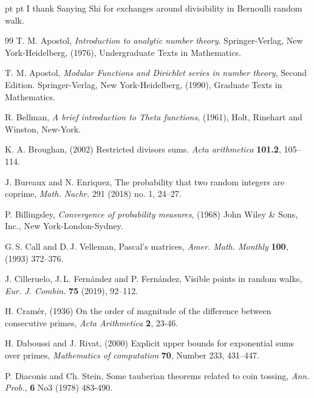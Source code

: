 \documentclass[11pt,draft,reqno]{amsart}
\theoremstyle{definition}
\theoremstyle{remarks}
\numberwithin{equation}{section}
\begin{document}
  pt
  pt  I    thank  Sanying Shi   for  exchanges     around divisibility  in Bernoulli random walk.  
 





 
\begin{thebibliography}{99}
  T. M. Apostol, \emph{Introduction to analytic number theory}. Springer-Verlag, New York-Heidelberg, (1976), Undergraduate Texts in Mathematics.
 
   T. M. Apostol, \emph{Modular Functions and Dirichlet series in number theory}, Second Edition. Springer-Verlag, New York-Heidelberg, (1990), Graduate Texts in Mathematics.
  
      R.  Bellman,  \emph{A brief introduction to Theta functions}, (1961), Holt, Rinehart and  Winston, New-York.

 K. A. Broughan, (2002) Restricted divisors sums. \emph{Acta arithmetica} {\bf 101.2},
105--114.
 
     J. Bureaux and N. Enriquez,   The probability that two random integers are coprime, \emph{Math. Nachr.} {291} (2018) no. 1, 24--27.  

   P. Billingsley,   \emph{  Convergence of probability measures}, (1968) John Wiley \& Sons, Inc.,
 New York-London-Sydney.  
 
   G.\,S. Call and D.\,J. Velleman, Pascal's matrices, \emph{Amer. Math. Monthly} {\bf 100},
  (1993) 372--376.
 
   J. Cilleruelo, J.\,L. Fern\'andez and P. Fern\'andez, Visible points in random walks, \emph{Eur. J. Combin. } {\bf 75} (2019),
  92--112. 
  
     H. Cram\'er, (1936) On the order of magnitude of the difference between consecutive primes, \emph{Acta
Arithmetica} {\bf 2},
  23-46.  

 H. Daboussi and J. Rivat, (2000) Explicit upper bounds for exponential sums over primes, \emph{Mathematics of computation} {\bf 70}, Number 233, 431--447.


   P. Diaconis  and Ch. Stein,  Some tauberian theorems related to coin tossing,  \emph{Ann. Prob.},   {\bf 6} No3  (1978) 483-490.  



\end{thebibliography}
\end{document}
